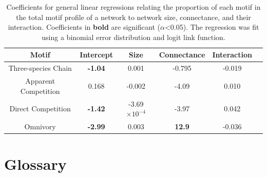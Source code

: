 \documentclass[12pt]{article}
\begin{document}
\begin{spacing}{2.0}
    
         \begin{table}[hb!]
            \centering
            \caption{Coefficients for general linear regressions relating the proportion of each motif in the total motif profile of a network to network size, connectance, and their interaction. Coefficients in \textbf{bold} are significant ($\alpha$\textless0.05). The regression was fit using a binomial error distribution and logit link function.}
           \label{network_prop_lms}
           \begin{tabular}{c|c c c c c}
                Motif & Intercept & Size & Connectance & Interaction \\
                \hline
                Three-species Chain & \textbf{-1.04} & 0.001 & -0.795 & -0.019 \\
                Apparent Competition & 0.168 & -0.002 & -4.09 & 0.010 \\
                Direct Competition & \textbf{-1.42} & -3.69$\times10^{-4}$ & -3.97 & 0.042 \\
                Omnivory & \textbf{-2.99} & 0.003 & \textbf{12.9} & -0.036\\
                \hline
                \end{tabular}
        \end{table}        
\clearpage
    
            




\clearpage

\section{Glossary}


\end{spacing}
\end{document}
